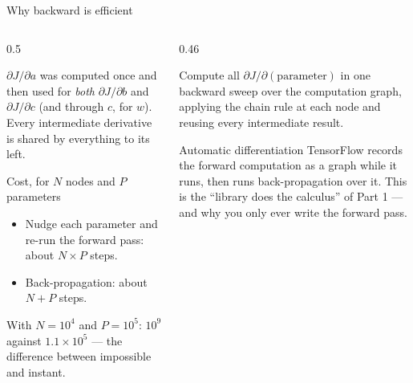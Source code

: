 \documentclass[aspectratio=169,10pt]{beamer}
\begin{document}
\begin{frame}{Why backward is efficient}
  \begin{columns}[T,onlytextwidth]
    \begin{column}{0.5\textwidth}
      \begin{keyidea}[Reuse]
        $\partial J/\partial a$ was computed once and then used for \emph{both}
        $\partial J/\partial b$ and $\partial J/\partial c$ (and through $c$, for $w$).
        Every intermediate derivative is shared by everything to its left.
      \end{keyidea}
      \footnotesize
      \begin{block}{Cost, for $N$ nodes and $P$ parameters}
        \begin{itemize}
          \item Nudge each parameter and re-run the forward pass: about $N\times P$ steps.
          \item Back-propagation: about $N+P$ steps.
        \end{itemize}
        With $N=10^4$ and $P=10^5$: $10^9$ against $1.1\times10^5$ --- the difference
        between impossible and instant.
      \end{block}
    \end{column}
    \begin{column}{0.46\textwidth}
      \footnotesize
      \begin{defnbox}
        \small Compute all $\partial J/\partial(\text{parameter})$ in one backward sweep over
        the computation graph, applying the chain rule at each node and reusing every
        intermediate result.
      \end{defnbox}
      \begin{block}{Automatic differentiation}
        TensorFlow records the forward computation as a graph while it runs, then runs
        back-propagation over it. This is the ``library does the calculus'' of Part 1 ---
        and why you only ever write the forward pass.
      \end{block}
    \end{column}
  \end{columns}
\end{frame}
\end{document}
